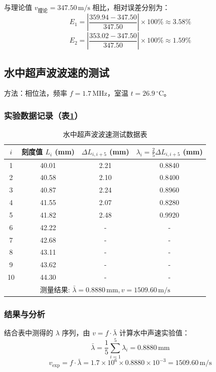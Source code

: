 \documentclass[11pt]{article}
\begin{document}
与理论值 $v_{\text{理论}} = 347.50\,\text{m/s}$ 相比，相对误差分别为：
\[ E_1 = \left| \frac{359.94 - 347.50}{347.50} \right| \times 100\% \approx 3.58\% \]
\[ E_2 = \left| \frac{353.02 - 347.50}{347.50} \right| \times 100\% \approx 1.59\% \]

\subsection{水中超声波波速的测试}

方法：相位法，频率 $f = 1.7\,\text{MHz}$，室温 $t = 26.9\,^\circ\text{C}$。

\subsubsection{实验数据记录（表\ref{tab:water_speed}）}

\begin{table}[h]
    \centering
    \caption{水中超声波波速测试数据表}
    \label{tab:water_speed}
    \begin{tabular}{cccc}
    \toprule
    $i$ & 刻度值 $L_i$ (mm) & $\Delta L_{i, i+5}$ (mm) & $\lambda_i = \frac{2}{5}\Delta L_{i, i+5}$ (mm) \\ 
    \midrule
    1  & 40.01 & 2.21 & 0.8840 \\ 
    2  & 40.58 & 2.10 & 0.8400 \\ 
    3  & 40.87 & 2.24 & 0.8960 \\ 
    4  & 41.55 & 2.07 & 0.8280 \\ 
    5  & 41.82 & 2.48 & 0.9920 \\ 
    6  & 42.22 & - & - \\ 
    7  & 42.68 & - & - \\ 
    8  & 43.11 & - & - \\ 
    9  & 43.62 & - & - \\ 
    10 & 44.30 & - & - \\ 
    \midrule
    \multicolumn{4}{c}{测量结果: $\bar{\lambda}=0.8880\,\text{mm}, v = 1509.60\,\text{m/s}$} \\ 
    \bottomrule
    \end{tabular}
\end{table}

\subsubsection{结果与分析}

结合表中测得的 $\lambda$ 序列，由 $v = f \cdot \bar{\lambda}$ 计算水中声速实验值：
\[ \bar{\lambda} = \frac{1}{5} \sum_{i=1}^{5} \lambda_i = 0.8880\,\text{mm} \]
\[ v_{\text{exp}} = f \cdot \bar{\lambda} = 1.7 \times 10^6 \times 0.8880 \times 10^{-3} = 1509.60\,\text{m/s} \]
\end{document}
